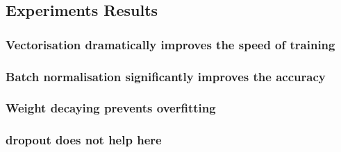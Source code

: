 \subsection{Experiments Results}
\subsubsection{Vectorisation dramatically improves the speed of training}
\subsubsection{Batch normalisation significantly improves the accuracy}
\subsubsection{Weight decaying prevents overfitting}
\subsubsection{dropout does not help here}
